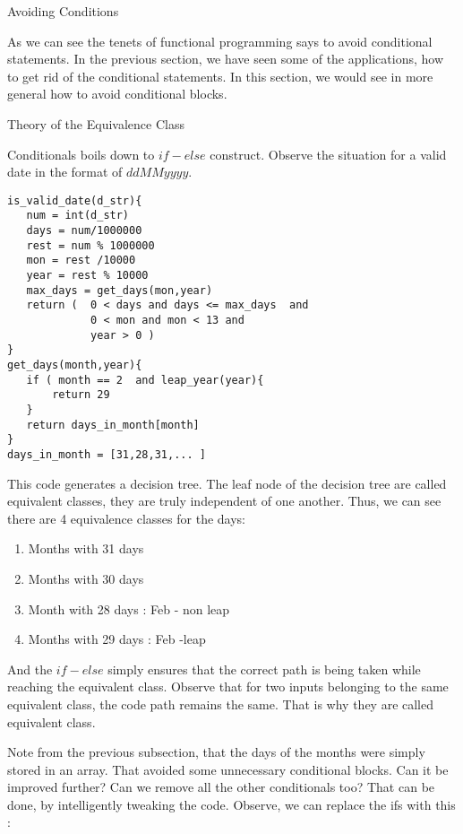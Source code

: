 \begin{section}{Avoiding Conditions}

As we can see the tenets of functional programming says to avoid conditional statements.
In the previous section, we have seen some of the applications, how to get rid of the conditional statements.
In this section, we would see in more general how to avoid conditional blocks.


\begin{subsection}{Theory of the Equivalence Class}

Conditionals boils down to $if-else$ construct.
Observe the situation for a valid date in the format of $ddMMyyyy$.

\begin{lstlisting}[style=JexlStyle]
is_valid_date(d_str){
   num = int(d_str) 
   days = num/1000000
   rest = num % 1000000
   mon = rest /10000
   year = rest % 10000 
   max_days = get_days(mon,year)  
   return (  0 < days and days <= max_days  and 
             0 < mon and mon < 13 and 
             year > 0 )      
}
get_days(month,year){
   if ( month == 2  and leap_year(year){
       return 29
   }
   return days_in_month[month] 
}
days_in_month = [31,28,31,... ]
\end{lstlisting}

This code generates a decision tree. The leaf node of the decision tree are
called equivalent classes, they are truly independent of one another.  
Thus, we can see there are 4 equivalence classes for the days:

\begin{enumerate}
\item{Months with 31 days}
\item{Months with 30 days}
\item{Month with 28 days : Feb - non leap}
\item{Months with 29 days : Feb -leap }
\end{enumerate}
 
And the $if - else$ simply ensures that the correct path is being taken
while reaching the equivalent class. Observe that for two inputs belonging 
to the same equivalent class, the code path remains the same.
That is why they are called equivalent class.

Note from the previous subsection, that the days of the months were simply stored
in an array. That avoided some unnecessary conditional blocks.
Can it be improved further? Can we remove all the other conditionals too?
That can be done, by intelligently tweaking the code.
Observe, we can replace the ifs with this :


\end{subsection}
\end{section}
